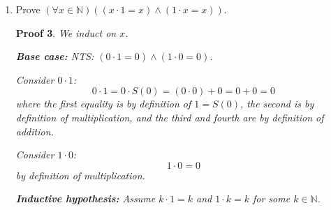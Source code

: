\documentclass[12pt]{article}
\theoremstyle{proofstyle}
\newtheorem*{proof*}{Proof}
\begin{document}
\begin{enumerate}[left=0pt, itemsep=2em, parsep=1em]
\begin{proof*}
    \textbf{Base case:} NTS: $S(n) + 0 = S(n + 0)$.
    \[
        S(n) + 0 = S(n) = S(n + 0)
    \]
    where the first equality is by definition of addition and the second is
    by definition of addition.

    \textbf{Inductive hypothesis:} Assume $S(n) + k = S(n + k)$
    for some $k \in \mathbb{N}$.

    \textbf{Inductive step:} NTS: $S(n) + S(k) = S(n + S(k))$.
    \[
        S(n) + S(k) = S(S(n) + k) = S(S(n + k)) = S(n + S(k))
    \]
    where the first equality is by definition of addition, the second is by
    the inductive hypothesis, and the third is by definition of addition. \qed
\end{proof*}

\textbf{Main proof:}

\begin{proof*}
    Let $x \in \mathbb{N}$. We induct on $y$.

    \textbf{Base case:} NTS: $x + 0 = 0 + x$.
    By definition of addition, $x + 0 = x$. By theorem, $0 + x = x$.
    Hence $x + 0 = 0 + x$.

    \textbf{Inductive hypothesis:} Assume $x + k = k + x$
    for some $k \in \mathbb{N}$.

    \textbf{Inductive step:} NTS: $x + S(k) = S(k) + x$.
    \[
        x + S(k) = S(x + k) = S(k + x) = S(k) + x
    \]
    where the first equality is by definition of addition, the second is by
    the inductive hypothesis, and the third is by the lemma. \qed
\end{proof*}

\item Prove $(\forall x \in \mathbb{N})((x \cdot 1 = x) \wedge (1 \cdot x = x))$.

\begin{proof*}
    We induct on $x$.

    \textbf{Base case:} NTS: $(0 \cdot 1 = 0) \wedge (1 \cdot 0 = 0)$.

    Consider $0 \cdot 1$:
    \[
        0 \cdot 1 = 0 \cdot S(0) = (0 \cdot 0) + 0 = 0 + 0 = 0
    \]
    where the first equality is by definition of $1 = S(0)$, the second is
    by definition of multiplication, and the third and fourth are by
    definition of addition.

    Consider $1 \cdot 0$:
    \[
        1 \cdot 0 = 0
    \]
    by definition of multiplication.

    \textbf{Inductive hypothesis:} Assume $k \cdot 1 = k$ and $1 \cdot k = k$
    for some $k \in \mathbb{N}$.


\end{proof*}
\end{enumerate}
\end{document}
